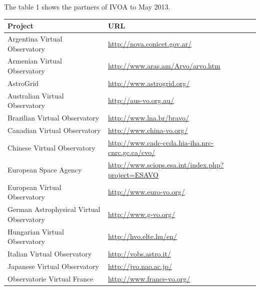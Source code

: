 \documentclass[11pt]{article}
\begin{document}
            The table 1 shows the partners of IVOA to May 2013.\\

            \begin{center}
                \begin{tabular}{|p{7cm} | p{7cm}|}
                    \hline
                    \textbf{Project} & \textbf{URL} \\
                    \hline
                    Argentina Virtual Observatory &
\url{http://nova.conicet.gov.ar/} \\
                    \hline
                    Armenian Virtual Observatory &
\url{http://www.aras.am/Arvo/arvo.htm} \\
                    \hline
                    AstroGrid & \url{http://www.astrogrid.org/} \\
                    \hline
                    Australian Virtual Observatory & \url{http://aus-vo.org.au/}
\\
                    \hline
                    Brazilian Virtual Observatory &
\url{http://www.lna.br/bravo/} \\
                    \hline
                    Canadian Virtual Observatory &
\url{http://www.china-vo.org/} \\
                    \hline
                    Chinese Virtual Observatory &
\url{http://www.cadc-ccda.hia-iha.nrc-cnrc.gc.ca/cvo/} \\
                    \hline
                    European Space Agency &
\url{http://www.sciops.esa.int/index.php?project=ESAVO} \\
                    \hline
                    European Virtual Observatory & \url{http://www.euro-vo.org/}
\\
                    \hline
                    German Astrophysical Virtual Observatory &
\url{http://www.g-vo.org/} \\
                    \hline
                    Hungarian Virtual Observatory & \url{http://hvo.elte.hu/en/}
\\
                    \hline
                    Italian Virtual Observatory & \url{http://vobs.astro.it/} \\
                    \hline
                    Japanese Virtual Observatory & \url{http://jvo.nao.ac.jp/}
\\
                    \hline
                    Observatorie Virtual France &
\url{http://www.france-vo.org/} \\
                    \hline

\end{tabular}
\end{center}
\end{document}
